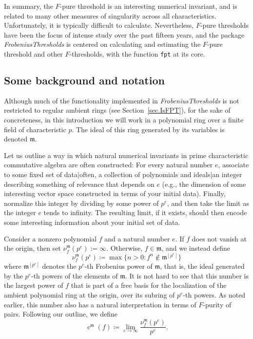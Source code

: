 \documentclass{amsart}
\newcommand{\ft}{\operatorname{c}}
\newcommand{\idealm}{\mathfrak{m}}
\begin{document}
In summary,  the $F$-pure threshold is an interesting numerical invariant, and is related to many other measures of singularity across all characteristics.
Unfortunately, it is typically difficult to calculate.
Nevertheless, $F$-pure thresholds have been the focus of intense study over the past fifteen years, and the package \emph{FrobeniusThresholds} is centered on calculating and estimating the $F$-pure threshold and other $F$-thresholds, with the function \texttt{fpt} at its core.

\subsection{Some background and notation}
Although much of the functionality implemented in \emph{FrobeniusThresholds} is not restricted to regular ambient rings (see Section~\ref{sec.IsFPT}), for the sake of concreteness, in this introduction  we will work in a polynomial ring over a finite field of  characteristic $p$.
The ideal of this ring generated by its variables is denoted $\idealm$.

Let us outline a way in which natural numerical invariants in prime characteristic commutative algebra are often constructed:  For every natural number $e$, associate to some fixed set of data|often, a collection of polynomials and ideals|an integer describing something of relevance that depends on $e$ (e.g., the dimension of some interesting vector space constructed in terms of your initial data).   Finally, normalize this integer by dividing by some power of $p^e$, and then take the limit as the integer $e$ tends to infinity.  The resulting limit, if it exists, should then encode some interesting information about your initial set of data.

Consider a nonzero polynomial $f$ and a natural number $e$.  If $f$ does not vanish at the origin, then set $\nu_f^{\idealm}(p^e) := \infty$.  Otherwise, $f \in \idealm$, and we instead define
\[ \nu_f^{\idealm}(p^e) \coloneqq  \max \{ n>0 : f^n \notin \idealm^{[p^e]} \} \]
where $\idealm^{[p^e]}$ denotes the $p^e$-th Frobenius power of $\idealm$, that is, the ideal generated by the $p^e$-th powers of the elements of $\idealm$.
It is not hard to see that this number is the largest power of $f$ that is part of a free basis for the localization of the ambient polynomial ring at the origin, over its subring of $p^e$-th powers.
As noted earlier, this number also has a natural interpretation in terms of $F$-purity of pairs.
Following our outline, we define
\[ \ft^{\idealm}(f) \coloneqq  \lim_{e \to \infty} \frac{ \nu_f^{\idealm}(p^e)}{p^e}. \]
\end{document}
